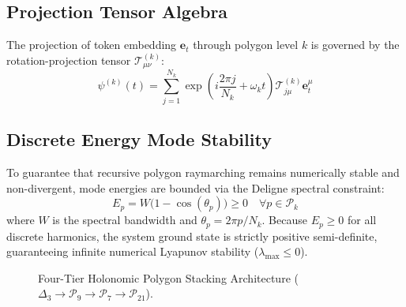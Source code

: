 \documentclass[11pt,oneside,letterpaper]{article}
\theoremstyle{sovereignstyle}
\begin{document}
\subsection{Projection Tensor Algebra}
The projection of token embedding $\mathbf{e}_t$ through polygon level $k$ is governed by the rotation-projection tensor $\mathcal{T}_{\mu\nu}^{(k)}$:
\begin{equation}
\psi^{(k)}(t) = \sum_{j=1}^{N_k} \exp\left(i \frac{2\pi j}{N_k} + \omega_k t\right) \mathcal{T}_{j\mu}^{(k)} \mathbf{e}_t^\mu
\end{equation}

\subsection{Discrete Energy Mode Stability}
To guarantee that recursive polygon raymarching remains numerically stable and non-divergent, mode energies are bounded via the Deligne spectral constraint:
\begin{equation}
E_p = W \big(1 - \cos(\theta_p)\big) \ge 0 \quad \forall p \in \mathcal{P}_k
\end{equation}
where $W$ is the spectral bandwidth and $\theta_p = 2\pi p / N_k$. Because $E_p \ge 0$ for all discrete harmonics, the system ground state is strictly positive semi-definite, guaranteeing infinite numerical Lyapunov stability ($\lambda_{\text{max}} \le 0$).

\begin{figure}[htbp]
\centering
{}
\caption{Four-Tier Holonomic Polygon Stacking Architecture ($\Delta_3 \to \mathcal{P}_9 \to \mathcal{P}_7 \to \mathcal{P}_{21}$).}
\label{fig:poly_stack}
\end{figure}
\end{document}

